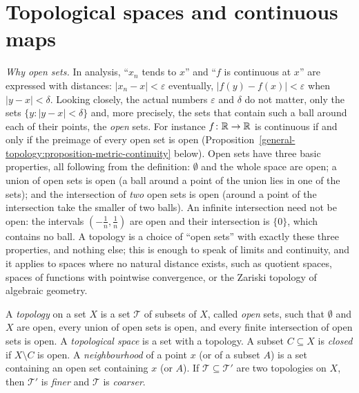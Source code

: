 \section{Topological spaces and continuous maps}\label{general-topology:section-spaces}

\emph{Why open sets.} In analysis, ``$x_n$ tends to $x$'' and ``$f$ is continuous at $x$'' are expressed with distances: $|x_n - x| < \varepsilon$ eventually, $|f(y) - f(x)| < \varepsilon$ when
$|y - x| < \delta$. Looking closely, the actual numbers $\varepsilon$ and $\delta$ do not matter, only the sets $\{y : |y - x| < \delta\}$ and, more precisely, the sets that contain such a ball around each of
their points, the \emph{open} sets. For instance $f \colon \mathbb{R} \to \mathbb{R}$ is continuous if and only if the preimage of every open set is open (Proposition~\ref{general-topology:proposition-metric-continuity}
below). Open sets have three basic properties, all following from the definition: $\emptyset$ and the whole space are open; a union of open sets is open (a ball around a point of the union lies in one of
the sets); and the intersection of \emph{two} open sets is open (around a point of the intersection take the smaller of two balls). An infinite intersection need not be open: the intervals
$(-\frac1n, \frac1n)$ are open and their intersection is $\{0\}$, which contains no ball. A topology is a choice of ``open sets'' with exactly these three properties, and nothing else; this is enough to
speak of limits and continuity, and it applies to spaces where no natural distance exists, such as quotient spaces, spaces of functions with pointwise convergence, or the Zariski topology of algebraic
geometry.

\begin{definition}\label{general-topology:definition-topology}
A \emph{topology} on a set $X$ is a set $\mathcal{T}$ of subsets of $X$, called \emph{open} sets, such that $\emptyset$ and $X$
are open, every union of open sets is open, and every finite intersection of open sets is open. A \emph{topological space}
is a set with a topology. A subset $C \subseteq X$ is \emph{closed} if $X \setminus C$ is open. A \emph{neighbourhood} of a point
$x$ (or of a subset $A$) is a set containing an open set containing $x$ (or $A$). If $\mathcal{T} \subseteq \mathcal{T}'$ are two
topologies on $X$, then $\mathcal{T}'$ is \emph{finer} and $\mathcal{T}$ is \emph{coarser}.
\end{definition}

